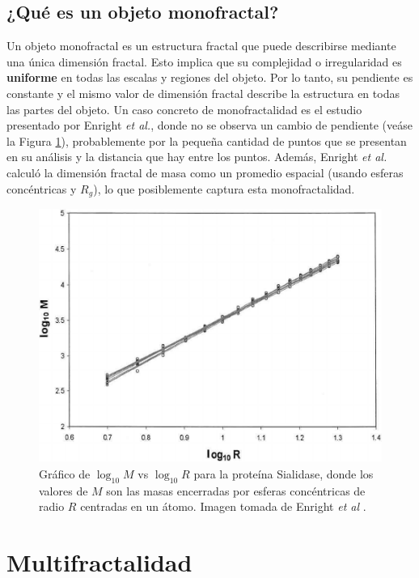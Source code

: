 \subsection*{¿Qu\'{e} es un objeto monofractal?}

Un objeto monofractal es un estructura fractal que puede describirse mediante una \'{u}nica dimensi\'{o}n fractal. Esto implica que su complejidad o irregularidad es \textbf{uniforme} en todas las escalas y regiones del objeto. Por lo tanto, su pendiente es constante y el mismo valor de dimensi\'{o}n fractal describe la estructura en todas las partes del objeto. Un caso concreto de monofractalidad es el estudio presentado por Enright \textit{et al.}\cite{Enright2005}, donde no se observa un cambio de pendiente (ve\'{a}se la Figura \ref{fig:Enright-Fractal}), probablemente por la pequeña cantidad de puntos que se presentan en su an\'{a}lisis y la distancia que hay entre los puntos. Adem\'{a}s, Enright \textit{et al.} calcul\'{o} la dimensi\'{o}n fractal de masa como un promedio espacial (usando esferas conc\'{e}ntricas y $R_g$), lo que posiblemente captura esta monofractalidad.

\begin{figure}[H]
	\begin{center}
		\includegraphics[width=0.6\linewidth]{graphs/Enright2005}
		\caption{Gr\'{a}fico de $\log_{10}M$ vs $\log_{10}R$ para la prote\'{i}na Sialidase, donde los valores de $M$ son las masas encerradas por esferas conc\'{e}ntricas de radio $R$ centradas en un \'{a}tomo. Imagen tomada de Enright \textit{et al} \cite{Enright2005}.}
		\label{fig:Enright-Fractal}
	\end{center}
\end{figure}

\section{Multifractalidad}

